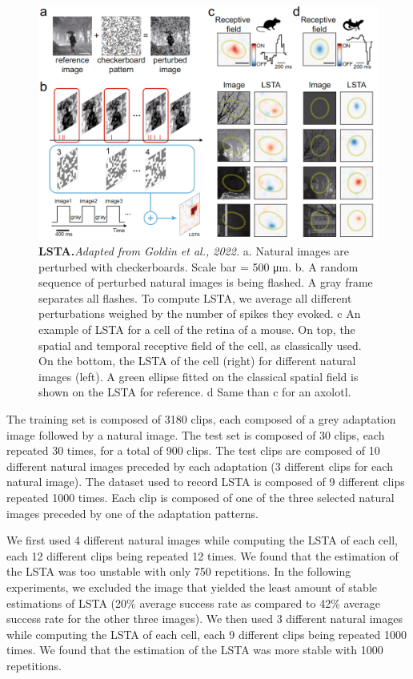 \begin{figure}
    \centering
    \includegraphics[width=\textwidth]{pics/LSTAExplainV2.png}
    \caption{\textbf{LSTA.}\textit{Adapted from Goldin et al., 2022.} a. Natural images are
    perturbed with checkerboards. Scale bar = 500 μm. b. A random sequence of perturbed natural
    images is being flashed. A gray frame separates all flashes. To compute LSTA, we average all different
    perturbations weighed by the number of spikes they evoked. c An example of LSTA for a cell of the
    retina of a mouse. On top, the spatial and temporal receptive field of the cell, as classically used. On
    the bottom, the LSTA of the cell (right) for different natural images (left). A green ellipse fitted on
    the classical spatial field is shown on the LSTA for reference. d Same than c for an axolotl. }
    \label{fig:LSTA}
\end{figure}

The training set is composed of 3180 clips, each composed of a grey
adaptation image followed by a natural image. The test set is composed of 30
clips, each repeated 30 times, for a total of 900 clips.
The test clips are composed of 10 different natural
images preceded by each adaptation (3 different clips for each natural image).
The dataset used to record LSTA is composed of 9 different clips repeated 1000
times. Each clip is composed of one of the three selected natural images
preceded by one of the adaptation patterns.

We first used 4 different natural images while computing the LSTA of each cell,
each 12 different clips being repeated 12 times. We found that the estimation
of the LSTA was too unstable with only 750 repetitions. In the following
experiments, we excluded the image that yielded the least amount of stable
estimations of LSTA (20\% average success rate as compared to 42\% average
success rate for the other three images). We then used 3 different natural
images while computing the LSTA of each cell, each 9 different clips being
repeated 1000 times. We found that the estimation of the LSTA was more stable
with 1000 repetitions.

